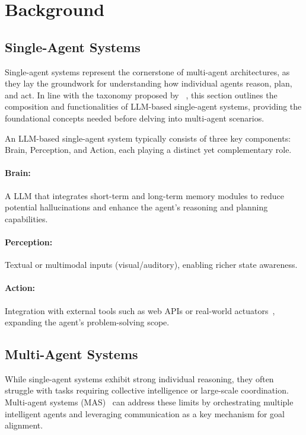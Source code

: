 \section{Background}
\subsection{Single-Agent Systems}
Single-agent systems represent the cornerstone of multi-agent architectures, as they lay the groundwork for understanding how individual agents reason, plan, and act. In line with the taxonomy proposed by ~\cite{agent_survey_1}, this section outlines the composition and functionalities of LLM-based single-agent systems, providing the foundational concepts needed before delving into multi-agent scenarios.

An LLM-based single-agent system typically consists of three key components: Brain, Perception, and Action, each playing a distinct yet complementary role.

\paragraph{Brain:}A LLM that integrates short-term and long-term memory modules to reduce potential hallucinations and enhance the agent's reasoning and planning capabilities.

\paragraph{Perception:}Textual or multimodal inputs (visual/auditory), enabling richer state awareness.

\paragraph{Action:}Integration with external tools such as web APIs or real-world actuators~\cite{embodied_agents}, expanding the agent’s problem-solving scope.

\subsection{Multi-Agent Systems}
While single-agent systems exhibit strong individual reasoning, they often struggle with tasks requiring collective intelligence or large-scale coordination. Multi-agent systems (MAS)~\cite{mas_define} can address these limits by orchestrating multiple intelligent agents and leveraging communication as a key mechanism for goal alignment. 

